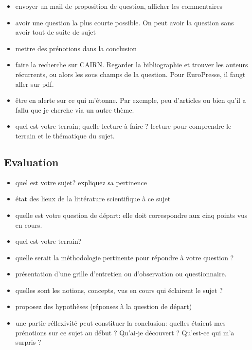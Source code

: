 \begin{itemize}
    \item envoyer un mail de proposition de question, afficher les commentaires
    \item avoir une question la plus courte possible. On peut avoir la question sans avoir tout de suite de sujet
    \item mettre des prénotions dans la conclusion
        \item faire la recherche sur CAIRN. Regarder la bibliographie et trouver les auteurs récurrents, ou alors les sous champs de la question. Pour EuroPresse, il faugt aller sur pdf. 
        \item être en alerte sur ce qui m'étonne. Par exemple, peu d'articles ou bien qu'il a fallu que je cherche via un autre thème.
        \item quel est votre terrain; quelle lecture à faire ? lecture pour comprendre le terrain et le thématique du sujet. 
\end{itemize}
\subsection{Evaluation}
\begin{itemize}
\item quel est votre sujet? expliquez sa pertinence
\item état des lieux de la littérature scientifique à ce sujet
\item quelle est votre question de départ: elle doit correspondre aux cinq points vus en cours.
\item quel est votre terrain?
\item quelle serait la méthodologie pertinente pour répondre à votre question ?
\item présentation d’une grille d’entretien ou d’observation ou questionnaire.
\item quelles sont les notions, concepts, vus en cours qui éclairent le sujet ?
\item proposez des hypothèses (réponses à la question de départ)
\item une partie réflexivité peut constituer la conclusion: quelles étaient mes prénotions sur ce sujet au début ? Qu’ai-je découvert ? Qu’est-ce qui m’a surpris ?

\end{itemize}


